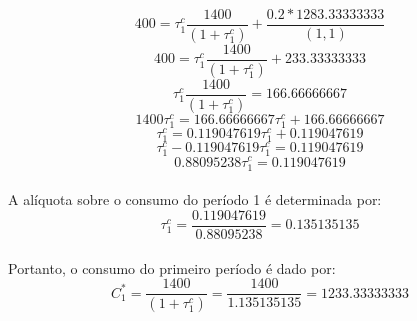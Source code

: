 \documentclass{article}
\begin{document}
\begin{equation}
    400 = \tau_1^c \frac{1400}{(1+\tau_1^c)} + \frac{0.2*1283.33333333}{(1,1)}
\end{equation}
\begin{equation}
    400 = \tau_1^c \frac{1400}{(1+\tau_1^c)} + 233.33333333
\end{equation}
\begin{equation}
    \tau_1^c \frac{1400}{(1+\tau_1^c)} = 166.66666667
\end{equation}
\begin{equation}
    1400\tau_1^c = 166.66666667\tau_1^c + 166.66666667
\end{equation}
\begin{equation}
    \tau_1^c = 0.119047619\tau_1^c + 0.119047619
\end{equation}
\begin{equation}
    \tau_1^c -0.119047619\tau_1^c = 0.119047619
\end{equation}
\begin{equation}
    0.88095238\tau_1^c = 0.119047619
\end{equation}
\\
A alíquota sobre o consumo do período 1 é determinada por:
\begin{equation}
    \tau_1^c = \frac{0.119047619}{0.88095238} = 0.135135135
\end{equation}
\\
Portanto, o consumo do primeiro período é dado por:
\begin{equation}
    C_1^*=\frac{1400}{(1+\tau_1^c)}=\frac{1400}{1.135135135}=1233.33333333
\end{equation}
\end{document}

